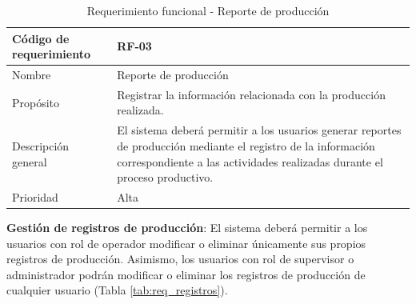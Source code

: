 \begin{table}[H]
    \centering
    \caption{Requerimiento funcional - Reporte de producción}
    \label{tab:req_reporte}
    \begin{tabularx}{\textwidth}{|X|X|}
        \hline
        Código de requerimiento & RF-03                                                                                                                                                                                       \\ \hline
        Nombre                  & Reporte de producción                                                                                                                                                                       \\ \hline
        Propósito               & Registrar la información relacionada con la producción realizada.                                                                                                                           \\ \hline
        Descripción general     & El sistema deberá permitir a los usuarios generar reportes de producción mediante el registro de la información correspondiente a las actividades realizadas durante el proceso productivo. \\ \hline
        Prioridad               & Alta                                                                                                                                                                                        \\ \hline
    \end{tabularx}
\end{table}


\textbf{Gestión de registros de producción}: El sistema deberá permitir a los usuarios con rol de operador modificar o eliminar únicamente sus propios registros de producción. Asimismo, los usuarios con rol de supervisor o administrador podrán modificar o eliminar los registros de producción de cualquier usuario (Tabla \ref{tab:req_registros}).

